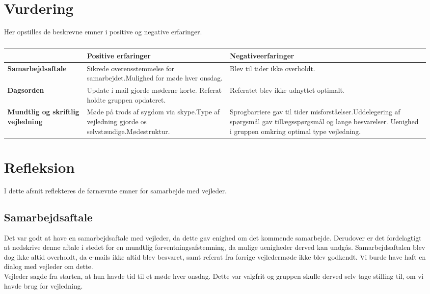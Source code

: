 \section{Vurdering}
Her opstilles de beskrevne emner i positive og negative erfaringer.
\begin{table}[h]
	\caption{}
	\begin{tabular}{|p{3.5cm}|p{5cm}|p{5cm}|}
		\hline
			 & \textbf{Positive erfaringer}  & \textbf{Negativeerfaringer} \\ \hline
			\textbf{Samarbejdsaftale}  & Sikrede overensstemmelse for samarbejdet.\newline Mulighed for møde hver onsdag. & Blev til tider ikke overholdt. \\ \hline
			\textbf{Dagsorden}& Update i mail gjorde møderne korte. \newline Referat holdte gruppen opdateret.  & Referatet blev ikke udnyttet optimalt. \\ \hline
			\textbf{Mundtlig og skriftlig vejledning} & Møde på trods af sygdom via skype.\newline Type af vejledning gjorde os selvstændige.\newline Mødestruktur.  & Sprogbarriere gav til tider misforståelser.\newline Uddelegering af spørgsmål gav tillægsspørgsmål og lange besvarelser. \newline Uenighed i gruppen omkring optimal type vejledning.      \\ \hline
	\end{tabular}
\end{table}

\section{Refleksion}
I dette afsnit reflekteres de førnævnte emner for samarbejde med vejleder.

\subsection{Samarbejdsaftale}
Det var godt at have en samarbejdsaftale med vejleder, da dette gav enighed om det kommende samarbejde. Derudover er det fordelagtigt at nedskrive denne aftale i stedet for en mundtlig forventningsafstemning, da mulige uenigheder derved kan undgås. Samarbejdsaftalen blev dog ikke altid overholdt, da e-mails ikke altid blev besvaret, samt referat fra forrige vejledermøde ikke blev godkendt. Vi burde have haft en dialog med vejleder om dette. \\
Vejleder sagde fra starten, at hun havde tid til et møde hver onsdag. Dette var valgfrit og gruppen skulle derved selv tage stilling til, om vi havde brug for vejledning.
	
